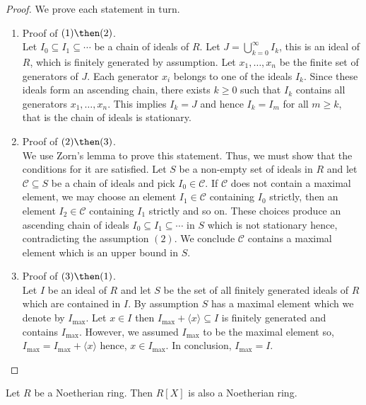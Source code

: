 \documentclass[12pt, a4paper]{article}
\begin{document}
\begin{proof}
    We prove each statement in turn.
    \begin{enumerate}
        \item Proof of \((1)\then(2)\). \\
        Let \(I_0 \subseteq I_1\subseteq \cdots\) be a chain of ideals of \(R\). Let \(J= \bigcup_{k=0}^{\infty} I_k\), this is an ideal of \(R\), which is finitely generated by assumption. Let \(x_1,\ldots,x_n\) be the finite set of generators of \(J\). Each generator \(x_i\) belongs to one of the ideals \(I_k\). Since these ideals form an ascending chain, there exists \(k\geq 0\) such that \(I_k\) contains all generators \(x_1,\ldots,x_n\). This implies \(I_k =J\) and hence \(I_k=I_m\) for all \(m\geq k\), that is the chain of ideals is stationary.
        \item Proof of \((2)\then (3)\).\\
        We use Zorn's lemma to prove this statement. Thus, we must show that the conditions for it are satisfied. Let \(S\) be a non-empty set of ideals in \(R\) and let \(\mathcal{C}\subseteq S\) be a chain of ideals and pick \(I_0 \in \mathcal{C}\). If \(\mathcal{C}\) does not contain a maximal element, we may choose an element \(I_1\in \mathcal{C}\) containing \(I_0\) strictly, then an element \(I_2\in \mathcal{C}\) containing \(I_1\) strictly and so on. These choices produce an ascending chain of ideals \(I_0\subseteq I_1\subseteq \cdots\) in \(S\) which is not stationary hence, contradicting the assumption \((2)\). We conclude \(\mathcal{C}\) contains a maximal element which is an upper bound in \(S\).
        \item Proof of \((3)\then (1)\). \\
        Let \(I\) be an ideal of \(R\) and let \(S\) be the set of all finitely generated ideals of \(R\) which are contained in \(I\). By assumption \(S\) has a maximal element which we denote by \(I_{\text{max}}\). Let \(x\in I\) then \(I_{\text{max}} +\langle x\rangle \subseteq I\) is finitely generated and contains \(I_{\text{max}}\). However, we assumed \(I_{\text{max}}\) to be the maximal element so, \(I_{\text{max}}=I_{\text{max}}+\langle x\rangle\) hence, \(x\in I_{\text{max}}\). In conclusion, \(I_{\text{max}}=I\).
    \end{enumerate}
\end{proof}

\begin{theorem}
    Let \(R\) be a Noetherian ring. Then \(R[X]\) is also a Noetherian ring.
\end{theorem}
\end{document}
